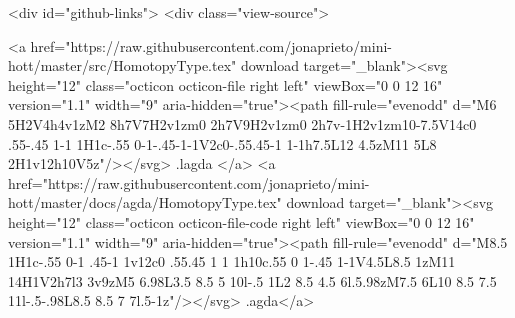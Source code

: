   <div id="github-links">
    <div class="view-source">
      
        <a href="https://raw.githubusercontent.com/jonaprieto/mini-hott/master/src/HomotopyType.tex" download target="_blank"><svg height="12" class="octicon octicon-file right left" viewBox="0 0 12 16" version="1.1" width="9" aria-hidden="true"><path fill-rule="evenodd" d="M6 5H2V4h4v1zM2 8h7V7H2v1zm0 2h7V9H2v1zm0 2h7v-1H2v1zm10-7.5V14c0 .55-.45 1-1 1H1c-.55 0-1-.45-1-1V2c0-.55.45-1 1-1h7.5L12 4.5zM11 5L8 2H1v12h10V5z"/></svg> .lagda </a>
        <a href="https://raw.githubusercontent.com/jonaprieto/mini-hott/master/docs/agda/HomotopyType.tex" download target="_blank"><svg height="12" class="octicon octicon-file-code right left" viewBox="0 0 12 16" version="1.1" width="9" aria-hidden="true"><path fill-rule="evenodd" d="M8.5 1H1c-.55 0-1 .45-1 1v12c0 .55.45 1 1 1h10c.55 0 1-.45 1-1V4.5L8.5 1zM11 14H1V2h7l3 3v9zM5 6.98L3.5 8.5 5 10l-.5 1L2 8.5 4.5 6l.5.98zM7.5 6L10 8.5 7.5 11l-.5-.98L8.5 8.5 7 7l.5-1z"/></svg> .agda</a>
      
